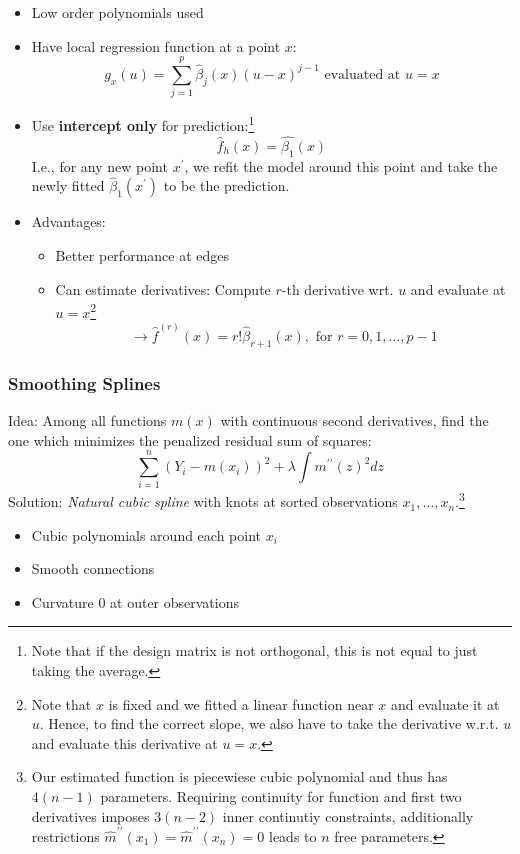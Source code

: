 \documentclass[11pt, %
	oneside, %
	english, %
	onehalfspacing, %
	]{article} %
\numberwithin{equation}{section}
\begin{document}
\begin{itemize}
    \item Low order polynomials used
    \item Have local regression function at a point $x$:
    \begin{equation*}
        g_x(u)=\sum_{j=1}^p \hat{\beta}_j(x)(u-x)^{j-1} \text { evaluated at } u=x
    \end{equation*}
    \item Use \textbf{intercept only} for prediction:\footnote{Note that if the design matrix is not orthogonal, this is not equal to just taking the average.}
    \begin{equation*}
        \hat{f}_h(x) = \hat{\beta_1} (x)
    \end{equation*}
    I.e., for any new point $x^\prime$, we refit the model around this point and take the newly fitted $\hat{\beta}_1(x^\prime)$ to be the prediction.
    \item Advantages:
    \begin{itemize}
        \item Better performance at edges
        \item Can estimate derivatives: Compute $r$-th derivative wrt. $u$ and evaluate at $u=x$\footnote{Note that $x$ is fixed and we fitted a linear function near $x$ and evaluate it at $u$. Hence, to find the correct slope, we also have to take the derivative w.r.t. $u$ and evaluate this derivative at $u=x$.}
        \begin{equation*}
                \rightarrow \hat{f}^{(r)}(x)=r!\hat{\beta}_{r+1}(x), \text { for } r=0,1, \ldots, p-1
        \end{equation*}
    \end{itemize}
\end{itemize}




\subsubsection*{Smoothing Splines}
Idea: Among all functions $m(x)$ with continuous second derivatives, find the one which minimizes the penalized residual sum of squares:
$$
\sum_{i=1}^n\left(Y_i-m\left(x_i\right)\right)^2+\lambda \int m^{\prime \prime}(z)^2 d z
$$
Solution: \emph{Natural cubic spline} with knots at sorted observations $x_1, \dots, x_n$.\footnote{Our estimated function is piecewiese cubic polynomial and thus has $4 (n-1)$ parameters. Requiring continuity for function and first two derivatives imposes $3 (n-2)$ inner continutiy constraints, additionally restrictions $\widehat{m}^{\prime \prime}\left(x_1\right)=\widehat{m}^{\prime \prime}\left(x_n\right)=0$ leads to $n$ free parameters.}
\begin{itemize}
    \item Cubic polynomials around each point $x_i$
    \item Smooth connections
    \item Curvature 0 at outer observations
\end{itemize}
\end{document}
